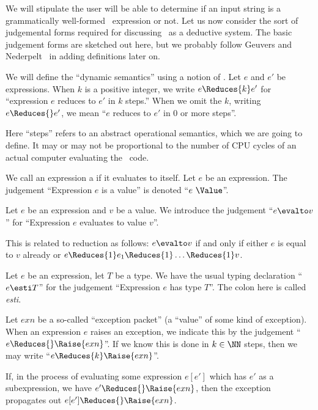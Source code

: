 \begin{node}\label{sml-0004}%
We will stipulate the user will be able to determine if an input string
is a grammatically well-formed \SML\ expression or not. Let us now
consider the sort of judgemental forms required for discussing \SML\ as
a deductive system. The basic judgement forms are sketched out here, but
we probably follow Geuvers and Nederpelt~\cite{nederpelt2014type} in
adding definitions later on.

\begin{node}\label{sml-0005}%
We will define the ``dynamic semantics'' using a notion of
. Let $e$ and $e'$ be expressions. When $k$ is a
positive integer, we write $e\Reduces{k}e'$ for ``expression $e$ reduces
to $e'$ in $k$ steps.'' When we omit the $k$, writing $e\Reduces{}e'$,
we mean ``$e$ reduces to $e'$ in $0$ or more steps''.

Here ``steps'' refers to an abstract operational semantics, which we are
going to define. It may or may not be proportional to the number of CPU
cycles of an actual computer evaluating the \SML\ code.
\end{node}

\begin{node}\label{sml-0006}%
We call an expression a  if it evaluates to itself.
Let $e$ be an expression. The judgement ``Expression $e$ is a value'' is
denoted ``$e~\Value$''.
\end{node}

\begin{node}\label{sml-0007}%
Let $e$ be an expression and $v$ be a value. We introduce the judgement
``$e\evalto v$'' for ``Expression $e$ evaluates to value $v$''. 

This is related to reduction as follows: $e\evalto v$ if and only if either
$e$ is equal to $v$ already or $e\Reduces{1}e_{1}\Reduces{1}\dots\Reduces{1}v$.
\end{node}

\begin{node}\label{sml-000C}%
Let $e$ be an expression, let $T$ be a type. We have the usual typing
declaration ``$e\esti T$'' for the judgement ``Expression $e$ has type $T$''.
The colon here is called \textit{esti}.
\end{node}

\begin{node}\label{sml-000F}%
Let $exn$ be a so-called ``exception packet'' (a ``value'' of some kind
of exception). When an expression $e$ raises an exception, we indicate
this by the judgement ``$e\Reduces{}\Raise{exn}$''. If we know this is done
in $k\in\NN$ steps, then we may write ``$e\Reduces{k}\Raise{exn}$''.

If, in the process of evaluating some expression $e[e']$ which has $e'$
as a subexpression, we have $e'\Reduces{}\Raise{exn}$, then
the exception propagates out $e[e']\Reduces{}\Raise{exn}$.
\end{node}
\end{node}
